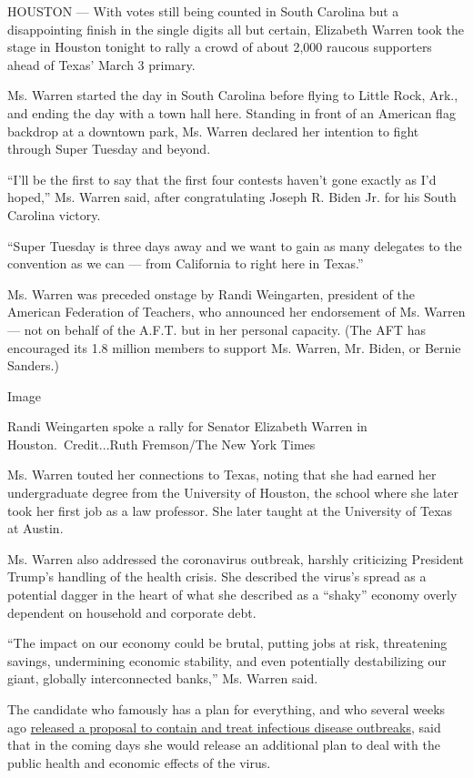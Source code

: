 HOUSTON --- With votes still being counted in South Carolina but a
disappointing finish in the single digits all but certain, Elizabeth
Warren took the stage in Houston tonight to rally a crowd of about 2,000
raucous supporters ahead of Texas' March 3 primary.

Ms. Warren started the day in South Carolina before flying to Little
Rock, Ark., and ending the day with a town hall here. Standing in front
of an American flag backdrop at a downtown park, Ms. Warren declared her
intention to fight through Super Tuesday and beyond.

``I'll be the first to say that the first four contests haven't gone
exactly as I'd hoped,'' Ms. Warren said, after congratulating Joseph R.
Biden Jr. for his South Carolina victory.

``Super Tuesday is three days away and we want to gain as many delegates
to the convention as we can --- from California to right here in
Texas.''

Ms. Warren was preceded onstage by Randi Weingarten, president of the
American Federation of Teachers, who announced her endorsement of Ms.
Warren --- not on behalf of the A.F.T. but in her personal capacity.
(The AFT has encouraged its 1.8 million members to support Ms. Warren,
Mr. Biden, or Bernie Sanders.)

Image

Randi Weingarten spoke a rally for Senator Elizabeth Warren in
Houston.~Credit...Ruth Fremson/The New York Times

Ms. Warren touted her connections to Texas, noting that she had earned
her undergraduate degree from the University of Houston, the school
where she later took her first job as a law professor. She later taught
at the University of Texas at Austin.

Ms. Warren also addressed the coronavirus outbreak, harshly criticizing
President Trump's handling of the health crisis. She described the
virus's spread as a potential dagger in the heart of what she described
as a ``shaky'' economy overly dependent on household and corporate debt.

``The impact on our economy could be brutal, putting jobs at risk,
threatening savings, undermining economic stability, and even
potentially destabilizing our giant, globally interconnected banks,''
Ms. Warren said.

The candidate who famously has a plan for everything, and who several
weeks ago
\href{https://elizabethwarren.com/plans/combating-infectious-disease-outbreaks?s}{released
a proposal to contain and treat infectious disease outbreaks}, said that
in the coming days she would release an additional plan to deal with the
public health and economic effects of the virus.

